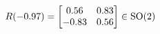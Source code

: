 \documentclass[preview]{standalone}
\begin{document}
\begin{align*}
\special{dvisvgm:raw <g id='unique000'>}R(-0.97) = \begin{bmatrix} 0.56 & 0.83 \\ -0.83 & 0.56 \end{bmatrix} \in \text{SO}(2)\special{dvisvgm:raw </g>}
\end{align*}
\end{document}
